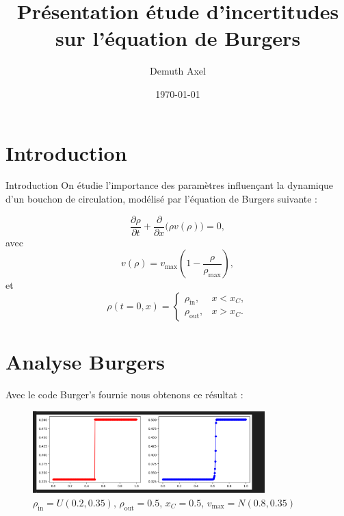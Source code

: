 \documentclass[10pt]{beamer}
\title{Présentation étude d'incertitudes sur l'équation de Burgers}
\author{Demuth Axel}
\date{\today}
\begin{document}
\maketitle

\section{Introduction}
\begin{frame}{Introduction}
    On étudie l'importance des paramètres influençant la dynamique d'un bouchon de circulation, modélisé par l'équation de Burgers suivante : 

    \begin{equation}
        \frac{\partial \rho}{\partial t} + \frac{\partial}{\partial x} \big(\rho v(\rho)\big) = 0,
        \end{equation}
        avec 
        \begin{equation}
        v(\rho) = v_{\text{max}} \left( 1 - \frac{\rho}{\rho_{\text{max}}} \right),
        \end{equation}
        et 
        \begin{equation}
        \rho(t = 0, x) =
        \begin{cases} 
        \rho_{\text{in}}, & x < x_C, \\
        \rho_{\text{out}}, & x > x_C.
        \end{cases}
    \end{equation}
        
\end{frame}

\section{Analyse Burgers}
\begin{frame}

    Avec le code Burger's fournie nous obtenons ce résultat : 
    \begin{figure}[h!]
        \centering
        \includegraphics[width=0.8\textwidth]{burger_classique.png} %
        \caption{\( \rho_{\text{in}} = U(0.2,0.35)\), \( \rho_{\text{out}} = 0.5 \), \( x_C = 0.5 \), \( v_{\text{max}} = N(0.8,0.35) \)}
        \label{fig:conditions_initiales}
    \end{figure}
    
\end{frame}
\end{document}
